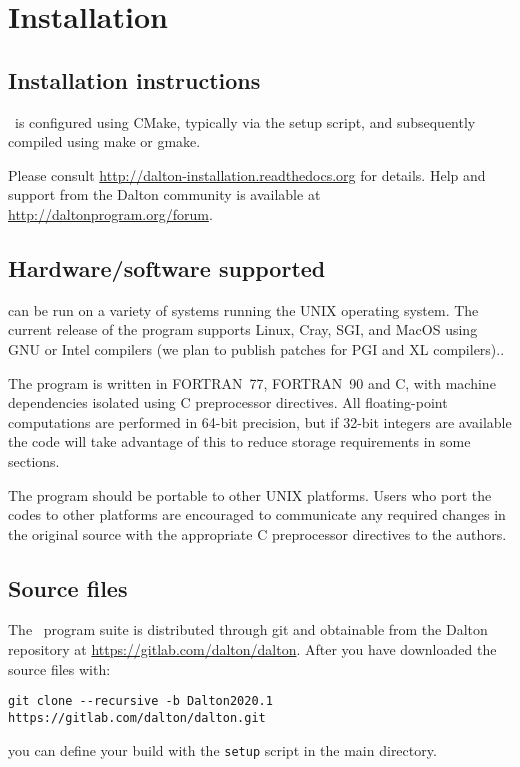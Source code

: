 \chapter{Installation}\label{ch:install}

\section{Installation instructions}

\dalton\ is configured using CMake, typically via the setup script,
and subsequently compiled using make or gmake.

Please consult \url{http://dalton-installation.readthedocs.org} for details.
Help and support from the Dalton community is available at \url{http://daltonprogram.org/forum}.

\section{Hardware/software
supported}\label{sec:hardsoft}

{\dalton} can be run on a variety of systems running the UNIX operating system.
The current release of the program supports Linux, Cray, SGI,
and MacOS using GNU or Intel compilers (we plan to publish patches
for PGI and XL compilers)..

The program is written in FORTRAN~77,
FORTRAN~90 and C, with machine dependencies
isolated using C preprocessor directives.  All
floating-point computations are performed in 64-bit precision, but if 32-bit
integers are available the code will take advantage of this to reduce storage
requirements in some sections.

The program should be portable to other UNIX platforms.  Users
who port the codes to other platforms are encouraged to communicate any
required changes in the original source with the appropriate C preprocessor
directives to the authors.

\section{Source files}\label{sec:source}

The
\latestrelease\
program suite is distributed through git and obtainable from the Dalton
repository at \url{https://gitlab.com/dalton/dalton}.
After you have downloaded the source files with:
\begin{verbatim}
git clone --recursive -b Dalton2020.1 https://gitlab.com/dalton/dalton.git
\end{verbatim}
you can define your build with the \verb|setup| script in the main directory.

